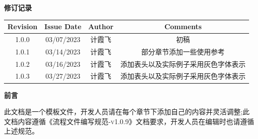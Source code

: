 \newpage
\thispagestyle{normal}
\begin{center}
    \Large \textbf{修订记录}
    \vspace*{0.5cm}
\end{center}

\begin{center}
    \begin{table}[htb]
    \begin{adjustbox}{width=1\textwidth}
    \begin{tabular}{|>{\normalsize}c|>{\normalsize}c|>{\normalsize}c|>{\normalsize}c|}
    \hline
    \rowcolor[HTML]{C0C0C0} 
    \textbf{Revision} & \textbf{Issue Date} & \textbf{Author} & \textbf{Comments}  \\ \hline
    1.0.0             & 03/07/2023          & 计霞飞             & 初稿                 \\ \hline
    1.0.1             & 03/14/2023          & 计霞飞             & 部分章节添加一些使用参考       \\ \hline
    1.0.2             & 03/16/2023          & 计霞飞             & 添加表头以及实际例子采用灰色字体表示 \\ \hline
    1.0.3             & 03/27/2023          & 计霞飞             & 添加表头以及实际例子采用灰色字体表示 \\ \hline
    \end{tabular}
    \end{adjustbox}
    \end{table}
\end{center}
\newpage
\thispagestyle{normal}
\begin{center}
    \Large \textbf{前言}
    \vspace*{0.5cm}
\end{center}

\begin{center}
    \normalsize \textsc{此文档是一个模板文件，开发人员请在每个章节下添加自己的内容并灵活调整;此文档内容遵循《流程文件编写规范-v1.0.9》文档要求，开发人员在编辑时也请遵循上述规范。}
\end{center}

\newpage

